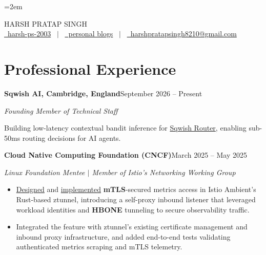 \documentclass[a4paper,10pt]{article}
\newcommand{\jobheader}[2]{%
    \par\noindent\textbf{#1}\hfill #2\par
}
\newcommand{\jobrole}[1]{%
    \textit{#1}\par
}
\newcommand{\jobgap}{\par\addvspace{8pt}}
\begin{document}
\setlength{\parskip}{0pt}
\setlength{\parindent}{0pt}
\linespread{0.97}\selectfont
\emergencystretch=2em

\pagestyle{empty}


{\centering
{\Huge HARSH PRATAP SINGH}\\[4pt]
\href{https://github.com/harsh-ps-2003}{\raisebox{-0.05\height}\faGithub\ harsh-ps-2003} \ $|$ \
\href{https://harsh-ps-2003.github.io/}{\raisebox{-0.05\height}\faGlobe \ personal blogs} \ $|$ \
\href{mailto:harshpratapsingh8210@gmail.com}{\raisebox{-0.05\height}\faEnvelope \ harshpratapsingh8210@gmail.com}\par
}


\section{Professional Experience}

\jobheader{Sqwish AI{\normalfont, Cambridge, England}}{September 2026 -- Present}
\jobrole{Founding Member of Technical Staff}
Building low-latency contextual bandit inference for \href{https://routeworks.github.io/}{Sqwish Router}, enabling sub-50ms routing decisions for AI agents.

\jobgap
\jobheader{Cloud Native Computing Foundation (CNCF)}{March 2025 -- May 2025}
\jobrole{Linux Foundation Mentee $|$ Member of Istio's Networking Working Group}
\begin{itemize}
    \item[--] \href{https://docs.google.com/document/d/19vMr22inhLAPjWcVJkZWiG_GY6ZG3PLxG9QqAmIlnIc/edit?tab=t.0\#heading=h.5d4q82tdn6qhq}{Designed} and \href{https://github.com/istio/ztunnel/pull/1507}{implemented} \textbf{mTLS}-secured metrics access in Istio Ambient's Rust-based ztunnel, introducing a self-proxy inbound listener that leveraged workload identities and \textbf{HBONE} tunneling to secure observability traffic.
    \item[--] Integrated the feature with ztunnel's existing certificate management and inbound proxy infrastructure, and added \mbox{end-to-end} tests validating authenticated metrics scraping and mTLS telemetry.
\end{itemize}
\end{document}
